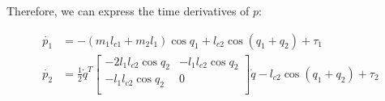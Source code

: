 \documentclass{article}
\begin{document}
Therefore, we can express the time derivatives of $p$:

\begin{align}
\dot{p_1} & =
	- (m_1 l_{c1} + m_2 l_1) \cos q_1 + l_{c2} \cos (q_1 + q_2) + \tau_1 \label{eq-dp1dt} \\
\dot{p_2} & = 
	\frac 12 \dot{q}^T 
	\left[ \begin{matrix}
	- 2 l_1 l_{c2} \cos q_2 & - l_1 l_{c2} \cos q_2  \\
	- l_1 l_{c2} \cos q_2  & 0 \\
	\end{matrix} \right]
	\dot{q}
	- l_{c2} \cos (q_1 + q_2)+ \tau_2 \label{eq-dp2dt}
\end{align}	
\end{document}
